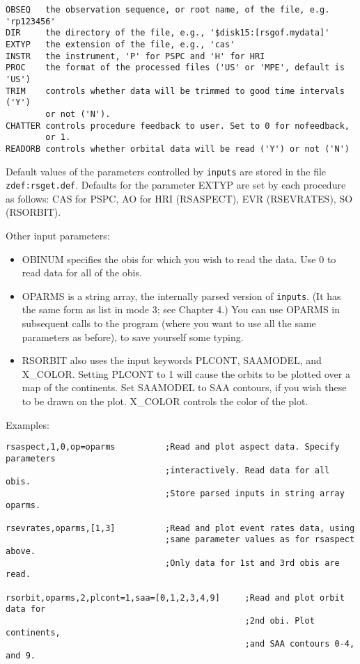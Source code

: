 \medskip\noindent
\begin{verbatim}
OBSEQ   the observation sequence, or root name, of the file, e.g. 'rp123456'
DIR     the directory of the file, e.g., '$disk15:[rsgof.mydata]'
EXTYP   the extension of the file, e.g., 'cas'
INSTR   the instrument, 'P' for PSPC and 'H' for HRI
PROC    the format of the processed files ('US' or 'MPE', default is 'US')
TRIM    controls whether data will be trimmed to good time intervals ('Y')
        or not ('N').
CHATTER controls procedure feedback to user. Set to 0 for nofeedback,
        or 1.
READORB controls whether orbital data will be read ('Y') or not ('N')
\end{verbatim}
Default values of the parameters controlled by {\tt inputs} are stored in the file
{\tt zdef:rsget.def}. Defaults for the parameter EXTYP are set by each procedure as
follows: CAS for PSPC, AO for HRI (RSASPECT), EVR (RSEVRATES),  SO (RSORBIT).
 
Other input parameters:

\begin{itemize}
\item  OBINUM specifies the obis for which you wish to read the data. Use 0 to
read data for all of the obis.
 
\item  OPARMS is a string array, the internally parsed version of {\tt inputs}. (It
has the same form as list in mode 3; see Chapter 4.) You can use OPARMS in
subsequent calls to the program (where you want to use all the same
parameters as before), to save yourself some typing.
 
\item  RSORBIT also uses the input keywords PLCONT, SAAMODEL, and X{\_}COLOR.
Setting PLCONT to 1 will cause the orbits to be plotted over a map of the
continents. Set SAAMODEL to SAA contours, if you wish these to be drawn
on the plot. X{\_}COLOR controls the color of the plot.
\end{itemize}
 
Examples:

\medskip\noindent
\begin{verbatim}
rsaspect,1,0,op=oparms          ;Read and plot aspect data. Specify parameters
                                ;interactively. Read data for all obis.
                                ;Store parsed inputs in string array oparms.
 
rsevrates,oparms,[1,3]          ;Read and plot event rates data, using
                                ;same parameter values as for rsaspect above.
                                ;Only data for 1st and 3rd obis are read.
 
rsorbit,oparms,2,plcont=1,saa=[0,1,2,3,4,9]     ;Read and plot orbit data for
                                                ;2nd obi. Plot continents,
                                                ;and SAA contours 0-4, and 9.
\end{verbatim}
 

